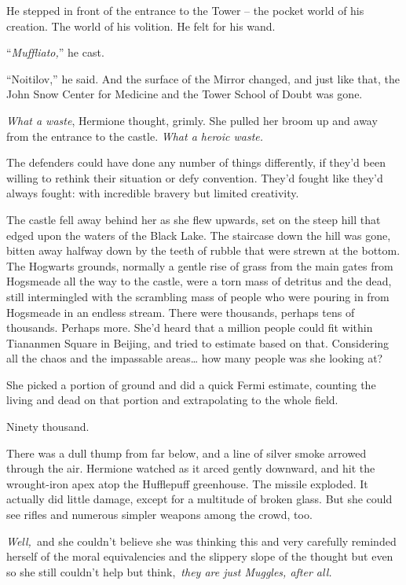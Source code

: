 He stepped in front of the entrance to the Tower -- the pocket world of
his creation. The world of his volition. He felt for his wand.

``\emph{Muffliato,}'' he cast.

``Noitilov,'' he said. And the surface of the Mirror changed, and just
like that, the John Snow Center for Medicine and the Tower School of
Doubt was gone.

\mybreak

\emph{What a waste}, Hermione thought, grimly. She pulled her broom up
and away from the entrance to the castle. \emph{What a heroic waste.}

The defenders could have done any number of things differently, if
they'd been willing to rethink their situation or defy convention.
They'd fought like they'd always fought: with incredible bravery but
limited creativity.

The castle fell away behind her as she flew upwards, set on the steep
hill that edged upon the waters of the Black Lake. The staircase down
the hill was gone, bitten away halfway down by the teeth of rubble that
were strewn at the bottom. The Hogwarts grounds, normally a gentle rise
of grass from the main gates from Hogsmeade all the way to the castle,
were a torn mass of detritus and the dead, still intermingled with the
scrambling mass of people who were pouring in from Hogsmeade in an
endless stream. There were thousands, perhaps tens of thousands. Perhaps
more. She'd heard that a million people could fit within Tiananmen
Square in Beijing, and tried to estimate based on that. Considering all
the chaos and the impassable areas\ldots{} how many people was she
looking at?

She picked a portion of ground and did a quick Fermi estimate, counting
the living and dead on that portion and extrapolating to the whole
field.

Ninety thousand.

There was a dull thump from far below, and a line of silver smoke
arrowed through the air. Hermione watched as it arced gently downward,
and hit the wrought-iron apex atop the Hufflepuff greenhouse. The
missile exploded. It actually did little damage, except for a multitude
of broken glass. But she could see rifles and numerous simpler weapons
among the crowd, too.

\emph{Well,}~and she couldn't believe she was thinking this and very
carefully reminded herself of the moral equivalencies and the slippery
slope of the thought but even so she still couldn't help but
think,~\emph{they are just Muggles, after all.}

